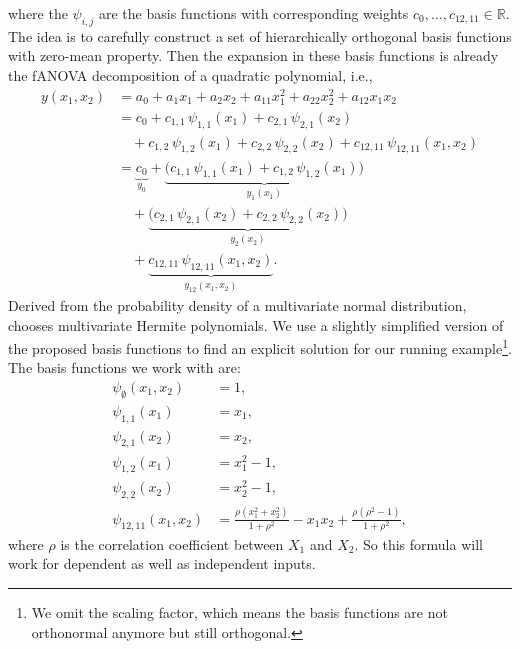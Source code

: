 where the $\psi_{i,j}$ are the basis functions with corresponding weights 
$c_0, \dots , c_{12,11} \in \mathbb{R}$.
The idea is to carefully construct a set of hierarchically orthogonal basis functions with zero-mean property. Then the expansion in these basis functions is already the 
fANOVA decomposition of a quadratic polynomial, i.e.,
\begin{align*}
y(x_1,x_2) 
&= a_0 + a_1 x_1 + a_2 x_2 
   + a_{11} x_1^2 + a_{22} x_2^2 + a_{12} x_1 x_2 \\[0.5em]
&= c_0 
   + c_{1,1}\,\psi_{1,1}(x_1) 
   + c_{2,1}\,\psi_{2,1}(x_2) \\[0.5em]
&\quad
   + c_{1,2}\,\psi_{1,2}(x_1)
   + c_{2,2}\,\psi_{2,2}(x_2)
   + c_{12,11}\,\psi_{12,11}(x_1,x_2) \\[0.5em]
&= 
   \underbrace{c_0}_{y_0}
   + \underbrace{\big(c_{1,1}\,\psi_{1,1}(x_1) 
                     + c_{1,2}\,\psi_{1,2}(x_1)\big)}_{y_1(x_1)} \\[0.5em]
&\quad
   + \underbrace{\big(c_{2,1}\,\psi_{2,1}(x_2) 
                     + c_{2,2}\,\psi_{2,2}(x_2)\big)}_{y_2(x_2)} \\[0.5em]
&\quad
   + \underbrace{c_{12,11}\,\psi_{12,11}(x_1,x_2)}_{y_{12}(x_1,x_2)}.
\end{align*}
Derived from the probability density of a multivariate normal distribution, \cite{rahman2014} chooses multivariate Hermite polynomials. We use a slightly simplified version of the proposed basis functions to find an explicit solution for our running example\footnote{We omit the scaling factor, which means the basis functions are not orthonormal anymore but still orthogonal.}. The basis functions we work with are:
\[
\begin{aligned}
\psi_{\emptyset}(x_1,x_2) &= 1, \\[0.5em]
\psi_{1,1}(x_1) &= x_1, \\[0.5em]
\psi_{2,1}(x_2) &= x_2, \\[0.5em]
\psi_{1,2}(x_1) &= x_1^2 - 1, \\[0.5em]
\psi_{2,2}(x_2) &= x_2^2 - 1, \\[0.5em]
\psi_{12,11}(x_1,x_2) &= \frac{\rho (x_1^2 + x_2^2)}{1 + \rho^2} 
                         - x_1 x_2 
                         + \frac{\rho(\rho^2 - 1)}{1 + \rho^2},
\end{aligned}
\]
where $\rho$ is the correlation coefficient between $X_1$ and $X_2$. So this formula will work for dependent as well as independent inputs.\par

